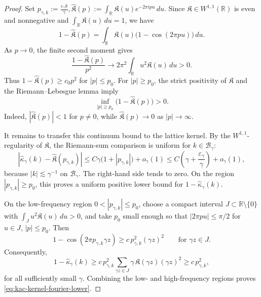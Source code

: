 \documentclass{article}
\begin{document}
\begin{proof}
Set
\(
p_{\gamma,k}:=\frac{\varepsilon_\gamma k}{\gamma},
\widehat{\mathfrak K}(p)
:=
\int_{\mathbb R}\mathfrak K(u)e^{-2\pi i p u}\,du .
\)
Since \(\mathfrak K\in W^{1,1}(\mathbb R)\) is even and nonnegative and \(\int_{\mathbb R}\mathfrak K(u)\,du=1\), we have
\[
1-\widehat{\mathfrak K}(p)
=
\int_{\mathbb R}\mathfrak K(u)\bigl(1-\cos(2\pi p u)\bigr)\,du .
\]
As \(p\to0\), the finite second moment gives
\[
\frac{1-\widehat{\mathfrak K}(p)}{p^2}
\longrightarrow
2\pi^2\int_{\mathbb R}u^2\mathfrak K(u)\,du>0.
\]
Thus \(1-\widehat{\mathfrak K}(p)\ge c_0p^2\) for \(|p|\le p_0\).
For \(|p|\ge p_0\), the strict positivity of \(\mathfrak K\) and the
Riemann--Lebesgue lemma imply
\[
\inf_{|p|\ge p_0}\bigl(1-\widehat{\mathfrak K}(p)\bigr)>0.
\]
Indeed, \(|\widehat{\mathfrak K}(p)|<1\) for \(p\ne0\), while
\(\widehat{\mathfrak K}(p)\to0\) as \(|p|\to\infty\).

It remains to transfer this continuum bound to the lattice kernel.  By the
\(W^{1,1}\)-regularity of \(\mathfrak K\), the Riemann-sum comparison is
uniform for \(k\in\mathcal B_\gamma\):
\[
\left|
\widehat\kappa_\gamma(k)-\widehat{\mathfrak K}(p_{\gamma,k})
\right|
\le
C\gamma\bigl(1+|p_{\gamma,k}|\bigr)+o_\gamma(1)
\le
C\left(\gamma+\frac{\varepsilon_\gamma}{\gamma}\right)+o_\gamma(1),
\]
because \(|k|\lesssim\gamma^{-1}\) on \(\mathcal B_\gamma\).  The right-hand
side tends to zero.  On the region \(|p_{\gamma,k}|\ge p_0\), this proves a
uniform positive lower bound for \(1-\widehat\kappa_\gamma(k)\).

On the low-frequency region \(0<|p_{\gamma,k}|\le p_0\), choose a compact
interval \(J\subset\mathbb R\setminus\{0\}\) with
\(\int_J u^2\mathfrak K(u)\,du>0\), and take \(p_0\) small enough so that
\(|2\pi p u|\le\pi/2\) for \(u\in J\), \(|p|\le p_0\).  Then
\[
1-\cos(2\pi p_{\gamma,k}\gamma z)
\ge
c\,p_{\gamma,k}^2(\gamma z)^2
\qquad\text{for }\gamma z\in J.
\]
Consequently,
\[
1-\widehat\kappa_\gamma(k)
\ge
c\,p_{\gamma,k}^2
\sum_{\gamma z\in J}
\gamma\,\mathfrak K(\gamma z)(\gamma z)^2
\ge
c\,p_{\gamma,k}^2,
\]
for all sufficiently small \(\gamma\).  Combining the low- and high-frequency
regions proves \eqref{eq:kac-kernel-fourier-lower}.
\end{proof}
\end{document}
